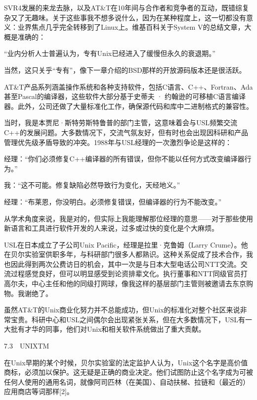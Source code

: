 \documentclass[a4paper,12pt,UTF8,twoside]{ctexbook}
\begin{document}
SVR4发展的来龙去脉，以及AT\&T在10年间与合作者和竞争者的互动，既错综复杂又了无趣味。关于这些事我不想多说什么，因为在某种程度上，这一切都没有意义：业界焦点几乎完全转移到了Linux上。维基百科关于System V的总结文章，大概是准确的：

“业内分析人士普遍认为，专有Unix已经进入了缓慢但永久的衰退期。”



当然，这只关乎“专有”，像下一章介绍的BSD那样的开放源码版本还是很活跃。

AT\&T产品系列涵盖操作系统和各种支持软件，包括C语言、C++、Fortran、Ada甚至Pascal的编译器，这些软件大部分基于史蒂夫 · 约翰逊的可移植C语言编译器。此外，公司还做了大量标准化工作，确保源代码和库中二进制格式的兼容性。

当时，我是本贾尼·斯特劳斯特鲁普的部门主管，这意味着会与USL频繁交流C++的发展问题。大多数情况下，交流气氛友好，但有时也会出现因科研和产品管理优先级矛盾导致的冲突。1988年与USL经理的一次激烈争论是这样的：

经理：“你们必须修复C++编译器的所有错误，但你不能以任何方式改变编译器行为。”

我：“这不可能。修复缺陷必然导致行为变化，天经地义。”

经理：“布莱恩，你没明白。必须修复错误，但编译器的行为不能改变。”



从学术角度来说，我是对的，但实际上我能理解那位经理的意思——对于那些使用新语言和工具进行软件开发的人来说，过多或过快的变化是个大麻烦。

USL在日本成立了子公司Unix Pacific，经理是拉里·克鲁姆（Larry Crume）。他在贝尔实验室供职多年，与科研部门很多人都熟识。这种关系促成了技术合作，我也因此得到两次公费访日的机会，其中一次是与日本大型电话公司NTT交流。交流过程感觉良好，但可以明显感受到论资排辈文化。执行董事和NTT同级官员打高尔夫，中心主任和他的同级打网球，像我这样的基层部门主管则被邀请去东京购物。我谢绝了。

虽然AT\&T的Unix商业化努力并不总能成功，但Unix的标准化对整个社区来说非常宝贵。科研中心和USL之间偶尔会出现紧张关系，但在大多数情况下，USL有一大批有才华的同事，他们对Unix和相关软件系统做出了重大贡献。





7.3　UNIXTM


在Unix早期的某个时候，贝尔实验室的法定监护人认为，Unix这个名字是高价值商标，必须加以保护。这无疑是正确的商业决定。他们试图防止这个名字成为可被任何人使用的通用名词，就像阿司匹林（在美国）、自动扶梯、拉链和（最近的）应用商店等词那样[2]。
\end{document}
